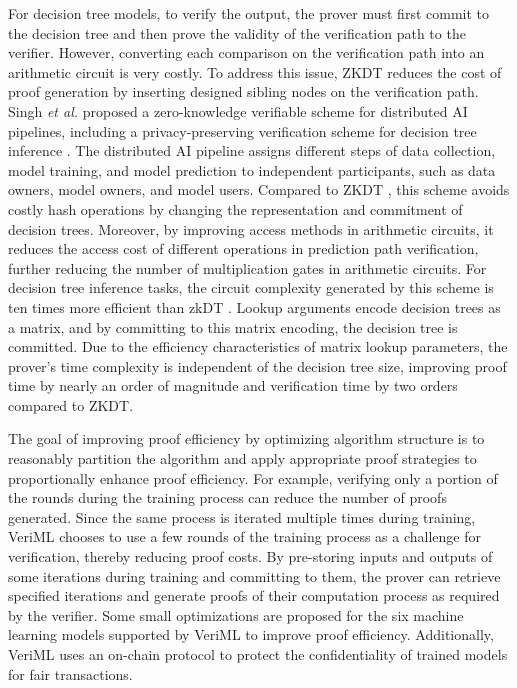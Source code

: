 \documentclass[journal]{IEEEtran}
\begin{document}
For decision tree models, to verify the output, the prover must first commit to the decision tree and then prove the validity of the verification path to the verifier. However, converting each comparison on the verification path into an arithmetic circuit is very costly. To address this issue, ZKDT \cite{sun2023zkdl} reduces the cost of proof generation by inserting designed sibling nodes on the verification path. Singh  \emph{et al.} proposed a zero-knowledge verifiable scheme for distributed AI pipelines, including a privacy-preserving verification scheme for decision tree inference \cite{singh2022zero}. The distributed AI pipeline assigns different steps of data collection, model training, and model prediction to independent participants, such as data owners, model owners, and model users. Compared to ZKDT \cite{sun2023zkdl}, this scheme avoids costly hash operations by changing the representation and commitment of decision trees. Moreover, by improving access methods in arithmetic circuits, it reduces the access cost of different operations in prediction path verification, further reducing the number of multiplication gates in arithmetic circuits. For decision tree inference tasks, the circuit complexity generated by this scheme is ten times more efficient than zkDT \cite{sun2023zkdl}. Lookup arguments \cite{campanelli2024lookup} encode decision trees as a matrix, and by committing to this matrix encoding, the decision tree is committed. Due to the efficiency characteristics of matrix lookup parameters, the prover's time complexity is independent of the decision tree size, improving proof time by nearly an order of magnitude and verification time by two orders compared to ZKDT.

The goal of improving proof efficiency by optimizing algorithm structure is to reasonably partition the algorithm and apply appropriate proof strategies to proportionally enhance proof efficiency. For example, verifying only a portion of the rounds during the training process can reduce the number of proofs generated. Since the same process is iterated multiple times during training, VeriML chooses to use a few rounds of the training process as a challenge for verification, thereby reducing proof costs. By pre-storing inputs and outputs of some iterations during training and committing to them, the prover can retrieve specified iterations and generate proofs of their computation process as required by the verifier. Some small optimizations are proposed for the six machine learning models supported by VeriML to improve proof efficiency. Additionally, VeriML uses an on-chain protocol to protect the confidentiality of trained models for fair transactions.
\end{document}
